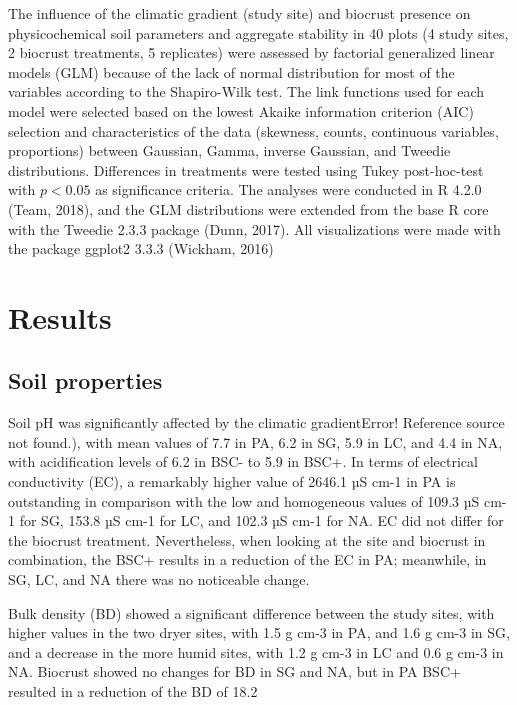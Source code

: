 The influence of the climatic gradient (study site) and biocrust presence on physicochemical soil parameters and aggregate stability in 40 plots (4 study sites, 2 biocrust treatments, 5 replicates) were assessed by factorial generalized linear models (GLM) because of the lack of normal distribution for most of the variables according to the Shapiro-Wilk test. The link functions used for each model were selected based on the lowest Akaike information criterion (AIC) selection and characteristics of the data (skewness, counts, continuous variables, proportions) between Gaussian, Gamma, inverse Gaussian, and Tweedie distributions. Differences in treatments were tested using Tukey post-hoc-test with $p <0.05$ as significance criteria. The analyses were conducted in R 4.2.0 (Team, 2018), and the GLM distributions were extended from the base R core with the Tweedie 2.3.3 package (Dunn, 2017). All visualizations were made with the package ggplot2 3.3.3 (Wickham, 2016)

\section{Results}
\subsection{Soil properties}

Soil pH was significantly affected by the climatic gradientError! Reference source not found.), with mean values of 7.7 in PA, 6.2 in SG, 5.9 in LC, and 4.4 in NA, with acidification levels of 6.2 in BSC- to 5.9 in BSC+. In terms of electrical conductivity (EC), a remarkably higher value of 2646.1 µS cm-1 in PA is outstanding in comparison with the low and homogeneous values of 109.3 µS cm-1 for SG, 153.8 µS cm-1 for LC, and 102.3 µS cm-1 for NA. EC did not differ for the biocrust treatment. Nevertheless, when looking at the site and biocrust in combination, the BSC+ results in a reduction of the EC in PA; meanwhile, in SG, LC, and NA there was no noticeable change. 

Bulk density (BD) showed a significant difference between the study sites, with higher values in the two dryer sites, with 1.5 g cm-3 in PA, and 1.6 g cm-3 in SG, and a decrease in the more humid sites, with 1.2 g cm-3 in LC and 0.6 g cm-3 in NA. Biocrust showed no changes for BD in SG and NA, but in PA BSC+ resulted in a reduction of the BD of 18.2%

